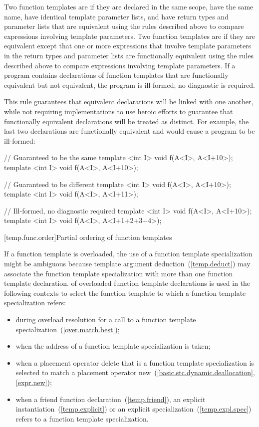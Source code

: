\pnum
Two function templates are
if they are declared in the same scope, have the same name, have
identical template parameter lists, and have return types and parameter
lists that are equivalent using the rules described above to compare
expressions involving
template parameters.
Two function templates are
if they are equivalent except that one or more
expressions
that involve template parameters in the return types and parameter
lists are functionally equivalent using the rules described above to
compare expressions involving
template parameters.
If a program contains declarations of function templates that are
functionally equivalent but not equivalent, the program is ill-formed;
no diagnostic is required.

\pnum
\enternote
This rule guarantees that equivalent declarations will be linked with
one another, while not requiring implementations to use heroic efforts
to guarantee that functionally equivalent declarations will be treated
as distinct.
For example, the last two declarations are functionally
equivalent and would cause a program to be ill-formed:

\begin{codeblock}
// Guaranteed to be the same
template <int I> void f(A<I>, A<I+10>);
template <int I> void f(A<I>, A<I+10>);

// Guaranteed to be different
template <int I> void f(A<I>, A<I+10>);
template <int I> void f(A<I>, A<I+11>);

// Ill-formed, no diagnostic required
template <int I> void f(A<I>, A<I+10>);
template <int I> void f(A<I>, A<I+1+2+3+4>);
\end{codeblock}
\exitnote

[temp.func.order]{Partial ordering of function templates}

\pnum
{}%
%
If a function template is overloaded,
the use of a function template specialization might be ambiguous because
template argument deduction~(\ref{temp.deduct}) may associate the function
template specialization with more than one function template declaration.
of overloaded function template declarations is used in the following contexts
to select the function template to which a function template specialization
refers:

\begin{itemize}
\item
during overload resolution for a call to a function template specialization~(\ref{over.match.best});
\item
when the address of a function template specialization is taken;
\item
when a placement operator delete that is a
function template
specialization
is selected to match a placement operator new~(\ref{basic.stc.dynamic.deallocation}, \ref{expr.new});
\item
when a friend function declaration~(\ref{temp.friend}), an
explicit instantiation~(\ref{temp.explicit}) or an explicit specialization~(\ref{temp.expl.spec}) refers to
a function template specialization.
\end{itemize}

